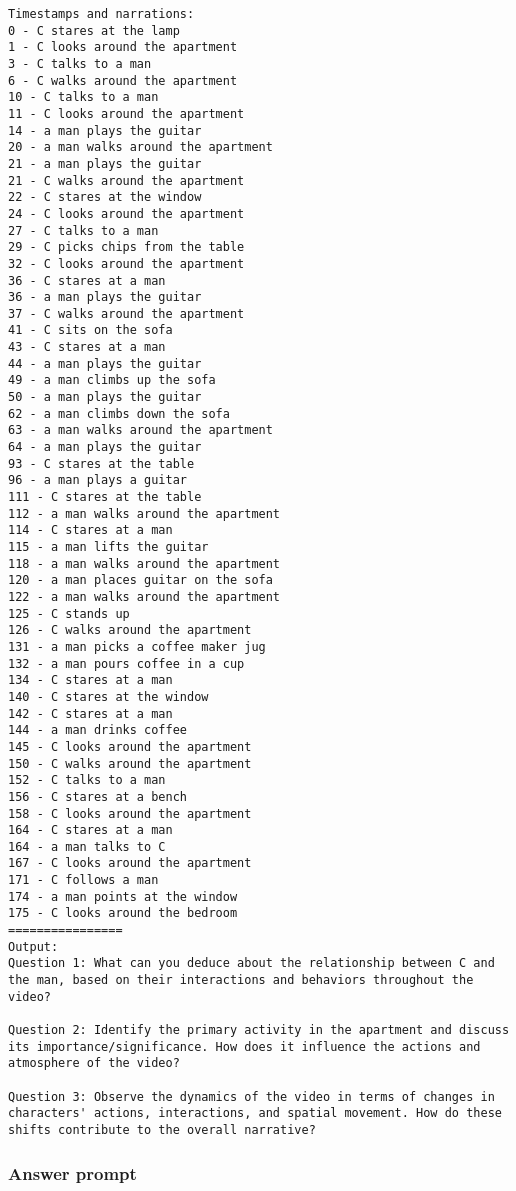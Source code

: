 \begin{lstlisting}
Timestamps and narrations:
0 - C stares at the lamp
1 - C looks around the apartment
3 - C talks to a man
6 - C walks around the apartment
10 - C talks to a man
11 - C looks around the apartment
14 - a man plays the guitar
20 - a man walks around the apartment
21 - a man plays the guitar
21 - C walks around the apartment
22 - C stares at the window
24 - C looks around the apartment
27 - C talks to a man
29 - C picks chips from the table
32 - C looks around the apartment
36 - C stares at a man
36 - a man plays the guitar
37 - C walks around the apartment
41 - C sits on the sofa
43 - C stares at a man
44 - a man plays the guitar
49 - a man climbs up the sofa
50 - a man plays the guitar
62 - a man climbs down the sofa
63 - a man walks around the apartment
64 - a man plays the guitar
93 - C stares at the table
96 - a man plays a guitar
111 - C stares at the table
112 - a man walks around the apartment
114 - C stares at a man
115 - a man lifts the guitar
118 - a man walks around the apartment
120 - a man places guitar on the sofa
122 - a man walks around the apartment
125 - C stands up
126 - C walks around the apartment
131 - a man picks a coffee maker jug
132 - a man pours coffee in a cup
134 - C stares at a man
140 - C stares at the window
142 - C stares at a man
144 - a man drinks coffee
145 - C looks around the apartment
150 - C walks around the apartment
152 - C talks to a man
156 - C stares at a bench
158 - C looks around the apartment
164 - C stares at a man
164 - a man talks to C
167 - C looks around the apartment
171 - C follows a man
174 - a man points at the window
175 - C looks around the bedroom
================
Output:
Question 1: What can you deduce about the relationship between C and the man, based on their interactions and behaviors throughout the video?

Question 2: Identify the primary activity in the apartment and discuss its importance/significance. How does it influence the actions and atmosphere of the video?

Question 3: Observe the dynamics of the video in terms of changes in characters' actions, interactions, and spatial movement. How do these shifts contribute to the overall narrative?
\end{lstlisting}\subsubsection{Answer prompt}
